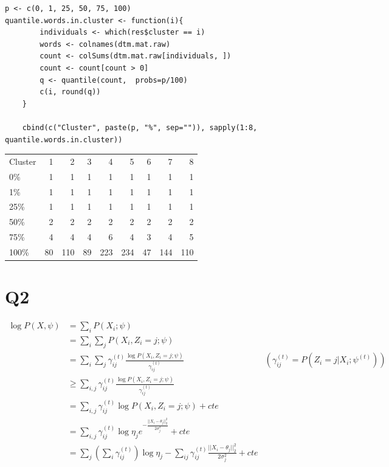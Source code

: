\documentclass[11pt]{article}
\begin{document}
\begin{verbatim}
p <- c(0, 1, 25, 50, 75, 100)
quantile.words.in.cluster <- function(i){
        individuals <- which(res$cluster == i)
        words <- colnames(dtm.mat.raw)
        count <- colSums(dtm.mat.raw[individuals, ])
        count <- count[count > 0]
        q <- quantile(count,  probs=p/100)
        c(i, round(q))
    }

    cbind(c("Cluster", paste(p, "%", sep="")), sapply(1:8, quantile.words.in.cluster))
\end{verbatim}

\begin{org}
\begin{center}
\begin{tabular}{lrrrrrrrr}
Cluster & 1 & 2 & 3 & 4 & 5 & 6 & 7 & 8\\
0\% & 1 & 1 & 1 & 1 & 1 & 1 & 1 & 1\\
1\% & 1 & 1 & 1 & 1 & 1 & 1 & 1 & 1\\
25\% & 1 & 1 & 1 & 1 & 1 & 1 & 1 & 1\\
50\% & 2 & 2 & 2 & 2 & 2 & 2 & 2 & 2\\
75\% & 4 & 4 & 4 & 6 & 4 & 3 & 4 & 5\\
100\% & 80 & 110 & 89 & 223 & 234 & 47 & 144 & 110\\
\end{tabular}
\end{center}
\end{org}




\section{Q2}
\label{sec:orgheadline4}

\begin{align*}
\log P(X, \psi)
&= \sum_i P(X_i; \psi)
\\&= \sum_i \sum_{j} P(X_i, Z_i = j; \psi)
\\&= \sum_i \sum_{j} \gamma_{ij}^{(t)} \frac{\log P(X_i, Z_i = j; \psi)}{\gamma_{ij}^{(t)}}
&(\gamma_{ij}^{(t)} = P(Z_i = j | X_i ; \psi^{(t)}))
\\&\ge \sum_{i, j}  \gamma_{ij}^{(t)} \frac{\log P(X_i, Z_i = j; \psi)}{\gamma_{ij}^{(t)}}
\\&= \sum_{i,j}  \gamma_{ij}^{(t)} \log P(X_i, Z_i = j; \psi) + cte
\\&= \sum_{i,j}  \gamma_{ij}^{(t)} \log \eta_j e^{- \frac{||X_i - \theta_j||_2^2}{2\sigma_j^2}} + cte
\\&= \sum_{j}  (\sum_i \gamma_{ij}^{(t)}) \log \eta_j - \sum_{ij} \gamma_{ij}^{(t)} \frac{||X_i - \theta_j||_2^2}{2\sigma_j^2} + cte
\end{align*}
\end{document}
